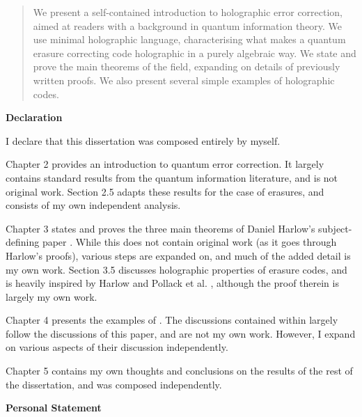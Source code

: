 \documentclass[12pt,a4paper]{report}
\numberwithin{equation}{section}
\theoremstyle{definition}
\theoremstyle{theorem}
\theoremstyle{theorem}
\theoremstyle{example}
\theoremstyle{definition}
\begin{document}
\newpage



\begin{abstract}
We present a self-contained introduction to holographic error correction, aimed at readers with a background in quantum information theory. We use minimal holographic language, characterising what makes a quantum erasure correcting code holographic in a purely algebraic way. We state and prove the main theorems of the field, expanding on details of previously written proofs. We also present several simple examples of holographic codes.
\end{abstract}


\begin{center}
\textbf{Declaration}
\end{center}

I declare that this dissertation was composed entirely by myself.

Chapter 2 provides an introduction to quantum error correction. It largely contains standard results from the quantum information literature, and is not original work. Section 2.5 adapts these results for the case of erasures, and consists of my own independent analysis.

Chapter 3 states and proves the three main theorems of Daniel Harlow's subject-defining paper \cite{Harlow}. While this does not contain original work (as it goes through Harlow's proofs), various steps are expanded on, and much of the added detail is my own work. Section 3.5 discusses holographic properties of erasure codes, and is heavily inspired by Harlow \cite{Harlow} and Pollack et al. \cite{Pollack}, although the proof therein is largely my own work.

Chapter 4 presents the examples of \cite{Pollack}. The discussions contained within largely follow the discussions of this paper, and are not my own work. However, I expand on various aspects of their discussion independently.

Chapter 5 contains my own thoughts and conclusions on the results of the rest of the dissertation, and was composed independently.

\newpage

\begin{center}
\textbf{Personal Statement}
\end{center}
\end{document}
